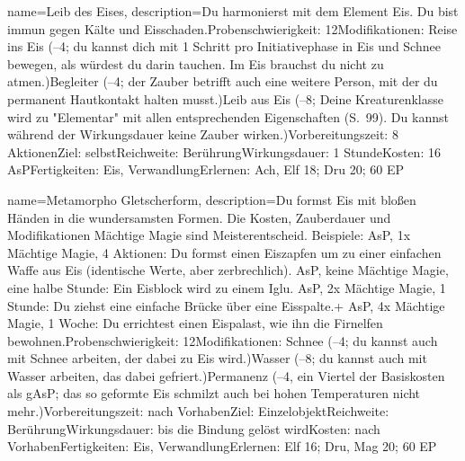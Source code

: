 {
    name={Leib des Eises},
    description={Du harmonierst mit dem Element Eis. Du bist immun gegen Kälte und Eisschaden.\newline Probenschwierigkeit: 12\newline Modifikationen: Reise ins Eis (–4; du kannst dich mit 1 Schritt pro Initiativephase in Eis und Schnee bewegen, als würdest du darin tauchen. Im Eis brauchst du nicht zu atmen.)\newline Begleiter (–4; der Zauber betrifft auch eine weitere Person, mit der du permanent Hautkontakt halten musst.)\newline Leib aus Eis (–8; Deine Kreaturenklasse wird zu "Elementar" mit allen entsprechenden Eigenschaften (S. 99). Du kannst während der Wirkungsdauer keine Zauber wirken.)\newline Vorbereitungszeit: 8 Aktionen\newline Ziel: selbst\newline Reichweite: Berührung\newline Wirkungsdauer: 1 Stunde\newline Kosten: 16 AsP\newline Fertigkeiten: Eis, Verwandlung\newline Erlernen: Ach, Elf 18; Dru 20; 60 EP}
}


{
    name={Metamorpho Gletscherform},
    description={Du formst Eis mit bloßen Händen in die wundersamsten Formen. Die Kosten, Zauberdauer und Modifikationen Mächtige Magie sind Meisterentscheid. Beispiele: AsP, 1x Mächtige Magie, 4 Aktionen: Du formst einen Eiszapfen um zu einer einfachen Waffe aus Eis (identische Werte, aber zerbrechlich). AsP, keine Mächtige Magie, eine halbe Stunde: Ein Eisblock wird zu einem Iglu. AsP, 2x Mächtige Magie, 1 Stunde: Du ziehst eine einfache Brücke über eine Eisspalte.+ AsP, 4x Mächtige Magie, 1 Woche: Du errichtest einen Eispalast, wie ihn die Firnelfen bewohnen.\newline Probenschwierigkeit: 12\newline Modifikationen: Schnee (–4; du kannst auch mit Schnee arbeiten, der dabei zu Eis wird.)\newline Wasser (–8; du kannst auch mit Wasser arbeiten, das dabei gefriert.)\newline Permanenz (–4, ein Viertel der Basiskosten als gAsP; das so geformte Eis schmilzt auch bei hohen Temperaturen nicht mehr.)\newline Vorbereitungszeit: nach Vorhaben\newline Ziel: Einzelobjekt\newline Reichweite: Berührung\newline Wirkungsdauer: bis die Bindung gelöst wird\newline Kosten: nach Vorhaben\newline Fertigkeiten: Eis, Verwandlung\newline Erlernen: Elf 16; Dru, Mag 20; 60 EP}
}



